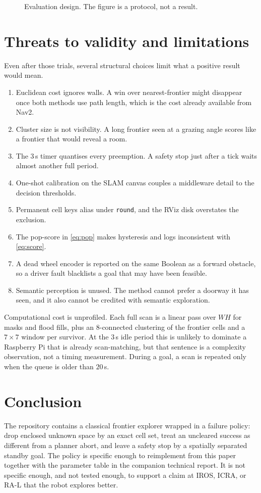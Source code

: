 \documentclass[11pt]{article}
\begin{document}
\begin{figure}[ht]
\centering
\FigExperiment
\caption{Evaluation design. The figure is a protocol, not a result.}
\label{fig:exp}
\end{figure}

\section{Threats to validity and limitations}
Even after those trials, several structural choices limit what a positive result would mean.
\begin{enumerate}
\item Euclidean cost ignores walls. A win over nearest-frontier might disappear once both methods use path length, which is the cost already available from Nav2.
\item Cluster size is not visibility. A long frontier seen at a grazing angle scores like a frontier that would reveal a room.
\item The $3$\,s timer quantises every preemption. A safety stop just after a tick waits almost another full period.
\item One-shot calibration on the SLAM canvas couples a middleware detail to the decision thresholds.
\item Permanent cell keys alias under \texttt{round}, and the RViz disk overstates the exclusion.
\item The pop-score in \eqref{eq:pop} makes hysteresis and logs inconsistent with \eqref{eq:score}.
\item A dead wheel encoder is reported on the same Boolean as a forward obstacle, so a driver fault blacklists a goal that may have been feasible.
\item Semantic perception is unused. The method cannot prefer a doorway it has seen, and it also cannot be credited with semantic exploration.
\end{enumerate}

Computational cost is unprofiled. Each full scan is a linear pass over $WH$ for masks and flood fills, plus an 8-connected clustering of the frontier cells and a $7\times 7$ window per survivor. At the $3$\,s idle period this is unlikely to dominate a Raspberry Pi that is already scan-matching, but that sentence is a complexity observation, not a timing measurement. During a goal, a scan is repeated only when the queue is older than $20$\,s.

\section{Conclusion}
The repository contains a classical frontier explorer wrapped in a failure policy: drop enclosed unknown space by an exact cell set, treat an uncleared success as different from a planner abort, and leave a safety stop by a spatially separated standby goal. The policy is specific enough to reimplement from this paper together with the parameter table in the companion technical report. It is not specific enough, and not tested enough, to support a claim at IROS, ICRA, or RA-L that the robot explores better.
\end{document}
